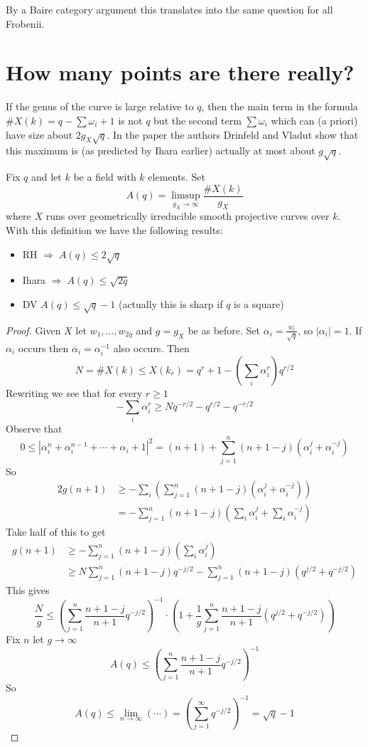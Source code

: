 \medskip\noindent
By a Baire category argument this translates into the same question
for all Frobenii.





\section{How many points are there really?}
\label{section-really}

\noindent
If the genus of the curve is large relative to $q$, then the main
term in the formula $\#X(k) = q - \sum \omega_i + 1$ is not $q$
but the second term $\sum \omega_i$ which can (a priori) have
size about $2g_X\sqrt{q}$. In the paper \cite{Drinfeld-number}
the authors Drinfeld and Vladut show that this maximum is (as predicted
by Ihara earlier) actually at most about $g\sqrt{q}$.

\medskip\noindent
Fix $q$ and let $k$ be a field with $k$ elements. Set
$$
A(q) = \limsup_{g_X \to \infty} \frac{\# X(k)}{g_X}
$$
where $X$ runs over geometrically irreducible smooth projective
curves over $k$. With this definition we have the following results:
\begin{itemize}
\item RH $\Rightarrow\; A(q)\leq 2\sqrt q$
\item Ihara $\Rightarrow\; A(q)\leq \sqrt{2q}$
\item DV $A(q)\leq \sqrt q-1$ (actually this is sharp if $q$ is a square)
\end{itemize}

\begin{proof}
Given $X$ let $w_1, \ldots, w_{2g}$ and $g = g_X$ be as before. Set
$\alpha_i = \frac{w_i}{\sqrt q}$, so $|\alpha_i| = 1$. If $\alpha_i$
occurs then $\overline{\alpha}_i = \alpha_i^{-1}$ also occurs. Then
$$
N = \# X(k) \leq X(k_r) = q^r + 1 - (\sum_i \alpha_i^r) q^{r/2}
$$
Rewriting we see that for every $r \geq 1$
$$
-\sum_i \alpha_i^r \geq Nq^{-r/2} - q^{r/2} - q^{-r/2}
$$
Observe that
$$
0 \leq |\alpha_i^n +\alpha_i^{n-1} +\cdots +\alpha_i +1|^2
= (n + 1) + \sum_{j = 1}^n (n + 1 - j) (\alpha_i^j + \alpha_i^{-j})
$$
So
\begin{align*}
2g(n+1) & \geq - \sum_i \left(\sum_{j=1}^n (n+1-j)(\alpha_i^j
+\alpha_i^{-j})\right)\\
&=-\sum_{j=1}^n (n+1-j)\left(\sum_i\alpha_i^j
+\sum_i\alpha_i^{-j}\right)
\end{align*}
Take half of this to get
\begin{align*}
g(n+1)&\geq -\sum_{j=1}^n (n+1-j)(\sum_i\alpha_i^j)\\
&\geq N\sum_{j=1}^n (n+1-j)q^{-j/2}-\sum_{j=1}^n
(n+1-j)(q^{j/2}+q^{-j/2})
\end{align*}
This gives
$$
\frac{N}{g}\leq \left(\sum_{j=1}^n \frac{n+1-j}{n+1}q^{-j/2}
\right)^{-1}\cdot\left(1+\frac{1}{g}\sum_{j=1}^n\frac{n+1-j}{n+1}(q^{j/2}+q^{-j/
2})\right)
$$
Fix $n$ let $g\to \infty$
$$
A(q)\leq \left(\sum_{j=1}^n \frac{n+1-j}{n+1}q^{-j/2}\right)^{-1}
$$
So
$$
A(q)\leq \lim_{n\to\infty}(\cdots) = \left(\sum_{j=1}^\infty
q^{-j/2}\right)^{-1}=\sqrt q-1
$$
\end{proof}











